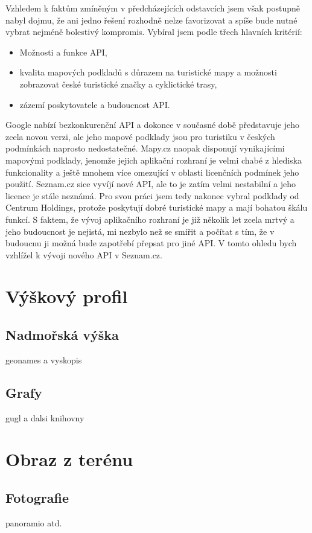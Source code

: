 Vzhledem k faktům zmíněným v předcházejících odstavcích jsem však
postupně nabyl dojmu, že ani jedno řešení rozhodně nelze favorizovat a
spíše bude nutné vybrat nejméně bolestivý kompromis. Vybíral jsem
podle třech hlavních kritérií:
\begin{itemize}
	\item Možnosti a funkce API,
	\item kvalita mapových podkladů s důrazem na turistické
	mapy a možnosti zobrazovat české turistické značky a cyklictické
	trasy,
	\item zázemí poskytovatele a budoucnost API.
\end{itemize}

Google nabízí bezkonkurenční API a dokonce v současné době
představuje jeho zcela novou verzi, ale jeho mapové podklady jsou pro turistiku v
českých podmínkách naprosto nedostatečné. Mapy.cz naopak disponují
vynikajícími mapovými podklady, jenomže jejich aplikační rozhraní je
velmi chabé z hlediska funkcionality a ještě mnohem více omezující v
oblasti licenčních podmínek jeho použití. Seznam.cz sice vyvíjí nové
API, ale to je zatím velmi nestabilní a jeho licence je stále
neznámá. Pro svou práci jsem tedy nakonec vybral podklady od Centrum
Holdings, protože poskytují dobré turistické mapy a mají bohatou
škálu funkcí. S faktem, že vývoj aplikačního rozhraní je již několik
let zcela mrtvý a jeho budoucnost je nejistá, mi nezbylo než se
smířit a počítat s tím, že v budoucnu ji možná bude zapotřebí přepsat
pro jiné API. V tomto ohledu bych vzhlížel k vývoji nového API v Seznam.cz.

\section{Výškový profil}\label{vyskovyProfil}
\subsection{Nadmořská výška}
geonames a vyskopis
\subsection{Grafy}\label{grafy}
gugl a dalsi knihovny

\section{Obraz z terénu}
\subsection{Fotografie}
panoramio atd.
